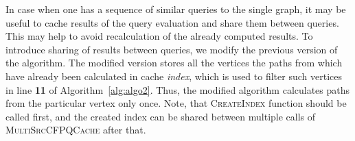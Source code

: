 In case when one has a sequence of similar queries to the single graph, it may be useful to cache results of the query evaluation and share them between queries.
This may help to avoid recalculation of the already computed results.
To introduce sharing of results between queries, we modify the previous version of the algorithm.
The modified version stores all the vertices the paths from which have already been calculated in cache \textit{index}, which is used to filter such vertices in line \textbf{11} of Algorithm~\ref{alg:algo2}.
Thus, the modified algorithm calculates paths from the particular vertex only once.
Note, that \textsc{CreateIndex} function should be called first, and the created index can be shared between multiple calls of \textsc{MultiSrcCFPQCache} after that.

%
%
%
%
%
%    
%
%



